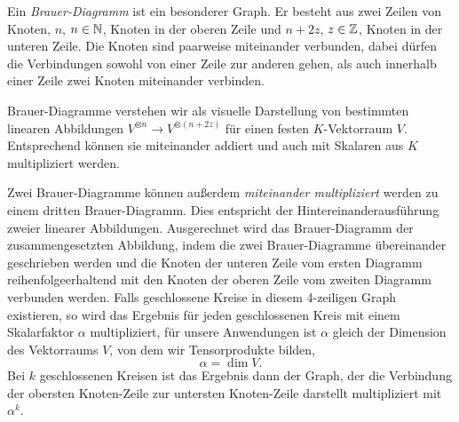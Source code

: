 \begin{definition}
	Ein \emph{Brauer-Diagramm} ist ein besonderer Graph. Er besteht aus zwei Zeilen von Knoten, $n$, $n\in\mathbb{N}$, Knoten in der oberen Zeile und $n+2z$, $z\in\mathbb{Z}$, Knoten in der unteren Zeile. Die Knoten sind paarweise miteinander verbunden, dabei dürfen die Verbindungen sowohl von einer Zeile zur anderen gehen, als auch innerhalb einer Zeile zwei Knoten miteinander verbinden.
	
    \smallbreak
	Brauer-Diagramme verstehen wir als visuelle Darstellung von bestimmten linearen Abbildungen $V^{\otimes n} \to V^{\otimes(n+2z)}$ für einen festen $K$-Vektorraum $V$. Entsprechend können sie miteinander addiert und auch mit Skalaren aus $K$ multipliziert werden.
	
    \smallbreak
	Zwei Brauer-Diagramme können außerdem \emph{miteinander multipliziert} werden zu einem dritten Brauer-Diagramm. Dies entspricht der Hintereinanderausführung zweier linearer Abbildungen. Ausgerechnet wird das Brauer-Diagramm der zusammengesetzten Abbildung, indem die zwei Brauer-Diagramme übereinander geschrieben werden und die Knoten der unteren Zeile vom ersten Diagramm reihenfolgeerhaltend mit den Knoten der oberen Zeile vom zweiten Diagramm verbunden werden. Falls geschlossene Kreise in diesem 4-zeiligen Graph existieren, so wird das Ergebnis für jeden geschlossenen Kreis mit einem Skalarfaktor $\alpha$ multipliziert, für unsere Anwendungen ist $\alpha$ gleich der Dimension des Vektorraums $V$, von dem wir Tensorprodukte bilden,
	\[\alpha = \dim{V}.\]
	Bei $k$ geschlossenen Kreisen ist das Ergebnis dann der Graph, der die Verbindung der obersten Knoten-Zeile zur untersten Knoten-Zeile darstellt multipliziert mit $\alpha^k$.
\end{definition}

